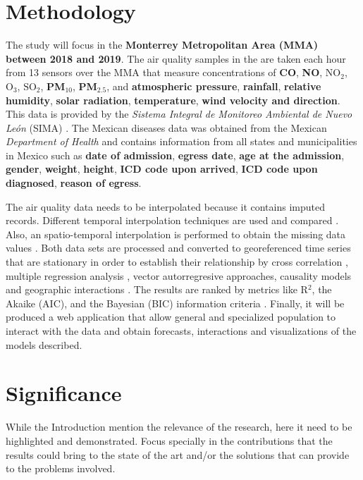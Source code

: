 \documentclass[
  11pt,
  a4paper,
  oneside
]{article}
\begin{document}
\section{Methodology}
The study will focus in the \textbf{Monterrey Metropolitan Area (MMA) between 2018 and 2019}. The air quality samples in the are taken each hour from 13 sensors over the MMA that measure concentrations of \textbf{CO}, \textbf{NO}, \textbf{$\text{NO}_2$}, \textbf{$\text{O}_3$}, \textbf{$\text{SO}_2$}, \textbf{PM$_{10}$}, \textbf{PM$_{2.5}$}, and \textbf{atmospheric pressure}, \textbf{rainfall}, \textbf{relative humidity}, \textbf{solar radiation}, \textbf{temperature}, \textbf{wind velocity and direction}. This data is provided by the \textit{Sistema Integral de Monitoreo Ambiental de Nuevo León} (SIMA) \citep{aireNL}. The Mexican diseases data was obtained from the Mexican \textit{Department of Health} \citep{egresos} and contains information from all states and municipalities in Mexico such as \textbf{date of admission}, \textbf{egress date}, \textbf{age at the admission}, \textbf{gender}, \textbf{weight}, \textbf{height}, \textbf{ICD code upon arrived}, \textbf{ICD code upon diagnosed}, \textbf{reason of egress}.

The air quality data needs to be interpolated because it contains imputed records. Different temporal interpolation techniques are used and compared \cite{Friedman1962}. Also, an spatio-temporal interpolation is performed to obtain the missing data values \cite{LiEA2002}. Both data sets are processed and converted to georeferenced time series \cite{Wei2019} that are stationary \cite{Hyndman2018} in order to establish their relationship by cross correlation \cite{derrickEA2004}, multiple regression analysis \cite{Brockwell2002}, vector autorregresive approaches, causality models \cite{popescuEA2013} and geographic interactions \cite{ComberEA2019}. The results are ranked by metrics like R$^2$, the Akaike (AIC), and the Bayesian (BIC) information criteria \cite{Albert2007}. Finally, it will be produced a web application that allow general and specialized population to interact with the data and obtain forecasts, interactions and visualizations of the models described.

\section{Significance}
While the Introduction mention the relevance of the research, here it need to be highlighted and demonstrated. Focus specially in the contributions that the results could bring to the state of the art and/or the solutions that can provide to the problems involved.
\end{document}
